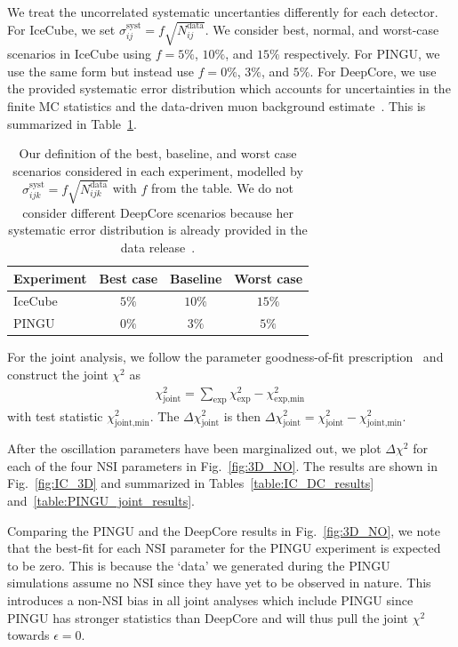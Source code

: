 We treat the uncorrelated systematic uncertanties differently for each detector. For IceCube, we set $\sigma_{ij}^\text{syst} = f\sqrt{N_{ij}^\text{data}}$.
We consider best, normal, and worst-case scenarios in IceCube using
$f=5\%$, $10\%$, and $15\%$ respectively. For PINGU, we use the same form but instead use $f=0\%$, $3\%$, and $5\%$.
For DeepCore, we use the provided systematic error distribution which accounts for uncertainties in the finite MC statistics and the data-driven 
muon background estimate~\cite{DC2019data}. This is summarized in Table~\ref{table:syst_errors}.
{\renewcommand{\arraystretch}{1.2}
\begin{table}
   \centering
   \begin{tabular}{lccc}
      \hline \hline
      Experiment & Best case & Baseline & Worst case \\
      \hline
      IceCube & $5\%$ & $10\%$ & $15\%$ \\
      PINGU & $0\%$ & $3\%$ & $5\%$ \\
      \hline \hline
   \end{tabular}
   \caption{Our definition of the best, baseline, and worst case scenarios considered in each experiment, modelled by $\sigma_{ijk}^\text{syst} = f\sqrt{N_{ijk}^\text{data}}$ with $f$ from the table.
   We do not consider different DeepCore scenarios because her systematic error distribution is already provided in the data release~\cite{DC2019data}.}\label{table:syst_errors}
\end{table}

For the joint analysis, we follow the parameter goodness-of-fit prescription~\cite{maltoni2003} and construct the joint $\chi^2$ as 
\begin{align}\label{eq:joint_chisq}
    \chi^2_\text{joint} = \sum_\text{exp}\chi^2_\text{exp} - \chi^2_\text{exp,min}\,
\end{align}
with test statistic $\chi^2_\text{joint,min}$. The $\Delta \chi^2_\text{joint}$ is then $\Delta \chi^2_\text{joint} = \chi^2_\text{joint} - \chi^2_\text{joint,min}$.

After the oscillation parameters have been marginalized out, we plot $\Delta \chi^2$ for each of the four NSI parameters in Fig.~\ref{fig:3D_NO}. 
The results are shown in Fig.~\ref{fig:IC_3D} and summarized in Tables~\ref{table:IC_DC_results} and~\ref{table:PINGU_joint_results}.

Comparing the PINGU and the DeepCore results in Fig.~\ref{fig:3D_NO}, we note that the best-fit for each NSI parameter for the PINGU experiment is expected to be zero. This is because the `data' we generated during 
the PINGU simulations assume no NSI since they have yet to be observed in nature. This introduces a non-NSI bias in all joint analyses which include PINGU
since PINGU has stronger statistics than DeepCore and will thus pull the joint $\chi^2$ towards $\epsilon =0$.

}
